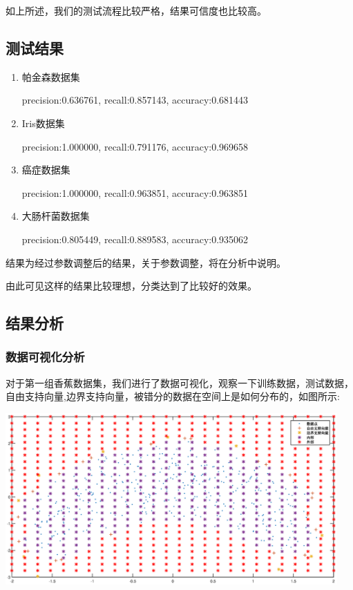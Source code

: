 \documentclass[article,12pt]{article}
\begin{document}
如上所述，我们的测试流程比较严格，结果可信度也比较高。

\subsection{测试结果}
\begin{enumerate}

\item 帕金森数据集

precision:0.636761, recall:0.857143, accuracy:0.681443

\item Iris数据集

precision:1.000000, recall:0.791176, accuracy:0.969658

\item 癌症数据集 

precision:1.000000, recall:0.963851, accuracy:0.963851

\item 大肠杆菌数据集

precision:0.805449, recall:0.889583, accuracy:0.935062

\end{enumerate}

结果为经过参数调整后的结果，关于参数调整，将在分析中说明。

由此可见这样的结果比较理想，分类达到了比较好的效果。

\subsection{结果分析}

\subsubsection{数据可视化分析}

对于第一组香蕉数据集，我们进行了数据可视化，观察一下训练数据，测试数据，自由支持向量,边界支持向量，被错分的数据在空间上是如何分布的，如图所示:

\begin{center}
\includegraphics[width = 5in]{banana.eps}
\end{center}
\end{document}
